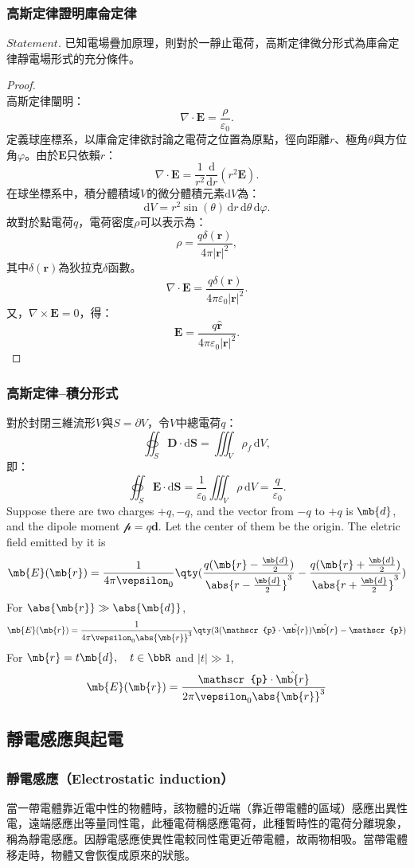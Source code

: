\documentclass[a4paper,12pt]{report}
\begin{document}
\begin{itemize}
\subsubsection{高斯定律證明庫侖定律}
\(\textit{Statement.}\) 已知電場疊加原理，則對於一靜止電荷，高斯定律微分形式為庫侖定律靜電場形式的充分條件。
\begin{proof}\mbox{}\\
高斯定律闡明：
\[\nabla\cdot\mathbf{E}=\frac{\rho}{\varepsilon_0}.\]
定義球座標系，以庫侖定律欲討論之電荷之位置為原點，徑向距離$r$、極角$\theta$與方位角$\varphi$。由於$\mathbf{E}$只依賴$r$：
\[\nabla\cdot\mathbf{E}=\frac{1}{r^2}\frac{\mathrm{d}}{\mathrm{d} r}\left(r^2\mathbf{E}\right).\]
在球坐標系中，積分體積域$V$的微分體積元素$\mathrm{d}V$為：
\[\mathrm{d}V=r^2\sin(\theta)\,\mathrm{d}r\,\mathrm{d}\theta\,\mathrm{d}\varphi.\]
故對於點電荷$q$，電荷密度$\rho$可以表示為：
\[\rho=\frac{q\delta(\mathbf{r})}{4\pi|\mathbf{r}|^2},\]
其中$\delta(\mathbf{r})$為狄拉克$\delta$函數。
\[\nabla\cdot\mathbf{E}=\frac{q\delta(\mathbf{r})}{4\pi\varepsilon_0|\mathbf{r}|^2}.\]
又，$\nabla\times\mathbf{E}=0$，得：
\[\mathbf{E}=\frac{q\hat{\mathbf{r}}}{4\pi\varepsilon_0|\mathbf{r}|^2}.\]
\end{proof}
\subsubsection{高斯定律–積分形式}
對於封閉三維流形$V$與$S=\partial V$，令$V$中總電荷$q$：
\[\oiint_S\mathbf{D}\cdot\mathrm{d}\mathbf{S}=\iiint_V\rho_f\,\mathrm{d}V,\]
即：
\[\oiint_{S}\mathbf {E} \cdot \mathrm{d}\mathbf{S}=\frac{1}{\varepsilon_0}\iiint_V\rho\,\mathrm{d}V=\frac{q}{\varepsilon_0}.\]
Suppose there are two charges $+q,-q$, and the vector from $-q$ to $+q$ is $\mb{d}$, and the dipole moment $\mathscr{p}=q\mathbf{d}$. Let the center of them be the origin. The eletric field emitted by it is
\[\mb{E}(\mb{r})=\frac{1}{4\pi\vepsilon_0}\qty(\frac{q(\mb{r}-\frac{\mb{d}}{2})}{\abs{r-\frac{\mb{d}}{2}}^3}-\frac{q(\mb{r}+\frac{\mb{d}}{2})}{\abs{r+\frac{\mb{d}}{2}}^3})\]
For $\abs{\mb{r}}\gg\abs{\mb{d}}$,
\[\mb{E}(\mb{r})=\frac{1}{4\pi\vepsilon_0\abs{\mb{r}}^3}\qty(3(\mathscr{p}\cdot\hat{\mb{r}})\hat{\mb{r}}-\mathscr{p})\]
For $\mb{r}=t\mb{d},\quad t\in\bbR$ and $|t|\gg1$,
\[\mb{E}(\mb{r})=\frac{\mathscr{p}\cdot\hat{\mb{r}}}{2\pi\vepsilon_0\abs{\mb{r}}^3}\]
\subsection{靜電感應與起電}
\subsubsection{靜電感應（Electrostatic induction）}
當一帶電體靠近電中性的物體時，該物體的近端（靠近帶電體的區域）感應出異性電，遠端感應出等量同性電，此種電荷稱感應電荷，此種暫時性的電荷分離現象，稱為靜電感應。因靜電感應使異性電較同性電更近帶電體，故兩物相吸。當帶電體移走時，物體又會恢復成原來的狀態。


\end{itemize}
\end{document}
